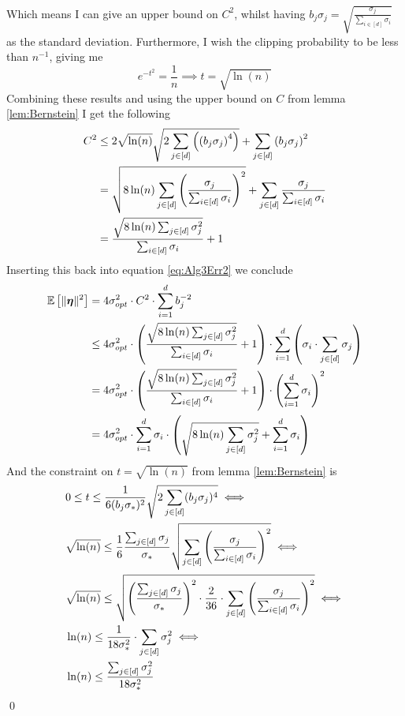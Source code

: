 \documentclass[a4paper,12pt]{article}
\renewenvironment{proof}{{\textit{Proof} \\}}{\qed}
\begin{document}
\begin{proof}
Which means I can give an upper bound on $C^2$, whilst having
$b_j \sigma_j = \sqrt{\frac{\sigma_j}{\sum_{i \in [d]} \sigma_i}}$ 
as the standard deviation.
Furthermore, I wish the clipping probability to be less than $n^{-1}$, giving me
\[
    e^{-t^2} = \frac{1}{n} \implies t = \sqrt{\ln (n)}
\]
Combining these results and using the upper bound on $C$ from lemma \ref{lem:Bernstein} I get the following
\begin{align*}
    C^2 &\le 2 \sqrt{\ln(n)} \sqrt{2\sum_{j \in [d]}  \left (\left (b_j\sigma_j\right)^4\right)} + 
    \sum_{j \in [d]} \left (b_j\sigma_j\right)^2 \\
    &=\sqrt{8 \ln(n) \sum_{j \in [d]} \left (\frac{\sigma_j}{\sum_{i \in [d]} \sigma_i}\right)^2} + 
    \sum_{j \in [d]} \frac{\sigma_j}{\sum_{i \in [d]} \sigma_i} \\
    &=\frac{\sqrt{8 \ln(n) \sum_{j \in [d]} \sigma_j^2}}{\sum_{i \in [d]} \sigma_i}
    + 1
\end{align*}
Inserting this back into equation \ref{eq:Alg3Err2} we conclude
\begin{align*}
    \mathbb{E} \left [ \| \bm{\eta} \|^2 \right] &= 4\sigma_{opt}^2 \cdot 
    C^2 \cdot \sum_{i=1}^d b_j^{-2} \\
    &\le 4\sigma_{opt}^2 \cdot 
    \left (\frac{\sqrt{8 \ln(n) \sum_{j \in [d]} \sigma_j^2}}{\sum_{i \in [d]} \sigma_i}
    + 1\right) \cdot \sum_{i=1}^d \left (\sigma_i \cdot \sum_{j \in [d]} \sigma_j\right) \\
    &= 4\sigma_{opt}^2 \cdot 
    \left (\frac{\sqrt{8 \ln(n) \sum_{j \in [d]} \sigma_j^2}}{\sum_{i \in [d]} \sigma_i}
    + 1\right) \cdot \left (\sum_{i=1}^d \sigma_i\right)^2 \\
    &= 4\sigma_{opt}^2 \cdot \sum_{i=1}^d \sigma_i \cdot 
    \left (\sqrt{8 \ln(n) \sum_{j \in [d]} \sigma_j^2}
    + \sum_{i=1}^d \sigma_i\right)
\end{align*}
And the constraint on $t = \sqrt{\ln (n)}$ from lemma \ref{lem:Bernstein} is
\begin{align*}
    &0 \le t \le \frac{1}{6 (b_j\sigma_*)^2} \sqrt{2\sum_{j \in [d]} (b_j\sigma_j)^4} \iff \\
    &\sqrt{\ln (n)} \le \frac{1}{6} \frac{\sum_{j \in [d]} \sigma_j}{\sigma_*} \sqrt{\sum_{j \in [d]} \left (\frac{\sigma_j}{\sum_{i \in [d]} \sigma_i}\right)^2} \iff \\
    &\sqrt{\ln (n)} \le \sqrt{\left (\frac{\sum_{j \in [d]} \sigma_j}{\sigma_*}\right)^2 \cdot \frac{2}{36} \cdot \sum_{j \in [d]} \left (\frac{\sigma_j}{\sum_{i \in [d]} \sigma_i}\right)^2} \iff \\
    &\ln (n) \le \frac{1}{18\sigma_*^2} \cdot \sum_{j \in [d]} \sigma_j^2 \iff \\
    &\ln (n) \le \frac{\sum_{j \in [d]} \sigma_j^2}{18 \sigma_*^2}
\end{align*}
\end{proof}
\end{document}
